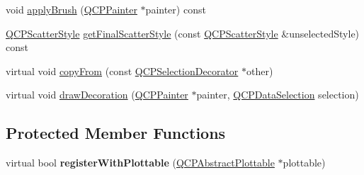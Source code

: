 \begin{DoxyCompactItemize}
\item 
void \hyperlink{classQCPSelectionDecorator_a225544527d51b49546b70d0e6d655a34}{apply\+Brush} (\hyperlink{classQCPPainter}{Q\+C\+P\+Painter} $\ast$painter) const
\item 
\hyperlink{classQCPScatterStyle}{Q\+C\+P\+Scatter\+Style} \hyperlink{classQCPSelectionDecorator_a1277b373248896bc70e8cc1de96da9fa}{get\+Final\+Scatter\+Style} (const \hyperlink{classQCPScatterStyle}{Q\+C\+P\+Scatter\+Style} \&unselected\+Style) const
\item 
virtual void \hyperlink{classQCPSelectionDecorator_a467a8d5cfcab27e862a17c797ac27b8a}{copy\+From} (const \hyperlink{classQCPSelectionDecorator}{Q\+C\+P\+Selection\+Decorator} $\ast$other)
\item 
virtual void \hyperlink{classQCPSelectionDecorator_a4f8eb49e277063845391e803ae23054a}{draw\+Decoration} (\hyperlink{classQCPPainter}{Q\+C\+P\+Painter} $\ast$painter, \hyperlink{classQCPDataSelection}{Q\+C\+P\+Data\+Selection} selection)
\end{DoxyCompactItemize}
\subsection*{Protected Member Functions}
\begin{DoxyCompactItemize}
\item 
\mbox{\label{classQCPSelectionDecorator_af66cb39e308da0285ae5d533e1e85027}} 
virtual bool {\bfseries register\+With\+Plottable} (\hyperlink{classQCPAbstractPlottable}{Q\+C\+P\+Abstract\+Plottable} $\ast$plottable)
\end{DoxyCompactItemize}
